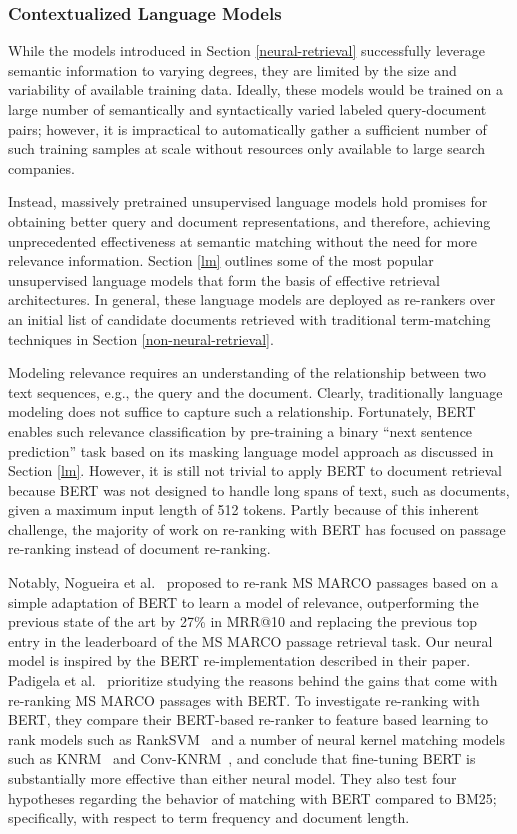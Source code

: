 \subsubsection{Contextualized Language Models}

While the models introduced in Section \ref{neural-retrieval} successfully leverage semantic information to varying degrees, they are limited by the size and variability of available training data.
Ideally, these models would be trained on a large number of semantically and syntactically varied labeled query-document pairs; however, it is impractical to automatically gather a sufficient number of such training samples at scale without resources only available to large search companies.

Instead, massively pretrained unsupervised language models hold promises for obtaining better query and document representations, and therefore, achieving unprecedented effectiveness at semantic matching without the need for more relevance information.
Section \ref{lm} outlines some of the most popular unsupervised language models that form the basis of effective retrieval architectures.
In general, these language models are deployed as re-rankers over an initial list of candidate documents retrieved with traditional term-matching techniques in Section \ref{non-neural-retrieval}.

Modeling relevance requires an understanding of the relationship between two text sequences, e.g., the query and the document.
Clearly, traditionally language modeling does not suffice to capture such a relationship.
Fortunately, BERT enables such relevance classification by pre-training a binary ``next sentence prediction'' task based on its masking language model approach as discussed in Section \ref{lm}.
However, it is still not trivial to apply BERT to document retrieval because BERT was not designed to handle long spans of text, such as documents, given a maximum input length of 512 tokens.
Partly because of this inherent challenge, the majority of work on re-ranking with BERT has focused on 
passage re-ranking instead of document re-ranking.

Notably, Nogueira et al.~\cite{nogueira2019passage} proposed to re-rank MS MARCO passages based on a simple adaptation of BERT to learn a model of relevance, outperforming the previous state of the art by 27\% in MRR@10 and replacing the previous top entry in the leaderboard of the MS MARCO passage retrieval task.
Our neural model is inspired by the BERT re-implementation described in their paper.
Padigela et al.~\cite{padigela2019bert} prioritize studying the reasons behind the gains that come with re-ranking MS MARCO passages with BERT.
To investigate re-ranking with BERT, they compare their BERT-based re-ranker to feature based learning to rank models such as RankSVM~\cite{joachims2002optimizing} and a number of neural kernel matching models such as KNRM~\cite{xiong2017knrm} and Conv-KNRM~\cite{dai2018convolutional}, and conclude that  fine-tuning BERT is substantially more effective than either neural model.
They also test four hypotheses regarding the behavior of matching with BERT compared to BM25; specifically, with respect to term frequency and document length.

